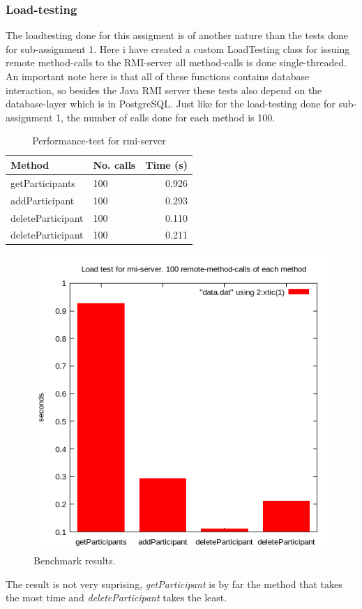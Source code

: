 \documentclass[a4paper, 11pt]{article}
\begin{document}
\subsubsection{Load-testing}
The loadtesting done for this assigment is of another nature than the tests done for sub-assignment 1. Here i have created a custom LoadTesting class for issuing remote method-calls to the RMI-server all method-calls is done single-threaded. An important note here is that all of these functions contains database interaction, so besides the Java RMI server these tests also depend on the database-layer which is in PostgreSQL. Just like for the load-testing done for sub-assignment 1, the number of calls done for each method is 100.\\
\begin{table}[H]
\centering
\label{Performance test for rmi-server}
\begin{tabular}{|l|l|r|}
\hline
\textbf{Method}  & \textbf{No. calls} & \textbf{Time (s)} \\ \hline
getParticipants	& 100 & 0.926 \\ \hline
addParticipant	& 100 & 0.293 \\ \hline
deleteParticipant & 100 & 0.110 \\ \hline
deleteParticipant & 100 & 0.211 \\ \hline
\end{tabular}
\caption{Performance-test for rmi-server}
\end{table}
\begin{figure}[H]
\includegraphics[scale=0.7]{rmiplot.png}
\caption{Benchmark results.}
\end{figure}
The result is not very suprising, \textit{getParticipant} is by far the method that takes the most  time and \textit{deleteParticipant} takes the least. \\
\end{document}

